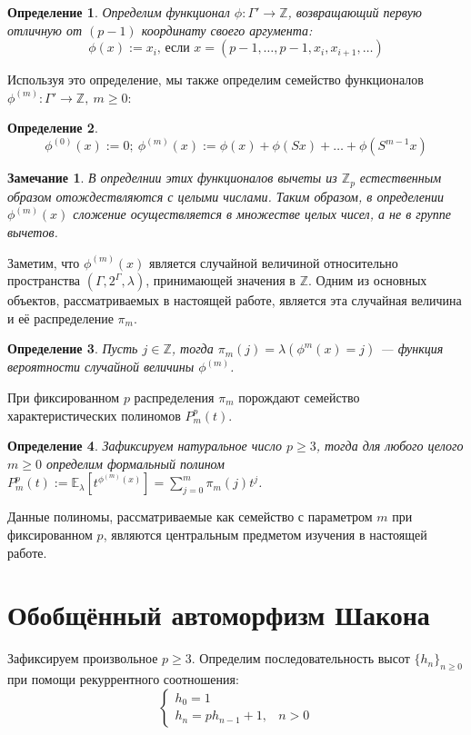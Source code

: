 \documentclass[14pt, a4paper, russian]{report}
\newtheorem{remark}{\indent Замечание}
\newtheorem{definition}{\indent Определение}
\begin{document}
\begin{definition}\label{phi}
Определим функционал $\phi: \Gamma' \to \mathbb{Z}$, возвращающий первую отличную от $(p-1)$ координату своего аргумента:
 \[\phi(x):=x_i\text{, если }x=(p-1, \ldots, p-1, x_i, x_{i+1}, \ldots)\]
\end{definition}
 Используя это определение, мы также определим семейство функционалов $\phi^{(m)}: \Gamma' \to \mathbb{Z},\ m \ge 0$:
\begin{definition}\label{phi_m}
    \[\phi^{(0)}(x):=0;\ \phi^{(m)}(x):=\phi(x)+\phi(Sx)+\ldots+\phi(S^{m-1}x)\]
\end{definition}
\begin{remark}
В определнии этих функционалов вычеты из $\mathbb{Z}_p$ естественным образом отождествляются с целыми числами. Таким образом, в определении $\phi^{(m)}(x)$ сложение осуществляется в множестве целых чисел, а не в группе вычетов.
\end{remark}
Заметим, что $\phi^{(m)}(x)$ является случайной величиной относительно пространства $(\Gamma, 2^\Gamma, \lambda)$, принимающей значения в $\mathbb{Z}$. Одним из основных объектов, рассматриваемых в настоящей работе, является эта случайная величина и её распределение $\pi_m$.
\begin{definition}\label{pi_m}
Пусть $j \in \mathbb{Z}$, тогда $\pi_m(j)=\lambda(\phi^{m}(x)=j)$ --- функция вероятности случайной величины $\phi^{(m)}$.
\end{definition}

При фиксированном $p$ распределения $\pi_m$ порождают семейство характеристических полиномов $P_m^p(t)$.

\begin{definition}\label{poly}
Зафиксируем натуральное число $p \ge 3$, тогда для любого целого $m \ge 0$ определим формальный полином $P_m^p(t):= \mathbb{E}_\lambda\left[ t^{\phi^{(m)}(x)}\right] = \sum\limits_{j=0}^m \pi_m(j) t^j$.
\end{definition}

Данные полиномы, рассматриваемые как семейство с параметром $m$ при фиксированном $p$, являются центральным предметом изучения в настоящей работе.

\section{Обобщённый автоморфизм Шакона}

Зафиксируем произвольное $p \ge 3$. Определим последовательность высот $\{h_n\}_{n \ge 0}$ при помощи рекуррентного соотношения:
$$\begin{cases}
h_0 = 1 \\
h_n = p h_{n-1}+1,& n > 0 
\end{cases}$$
\end{document}
